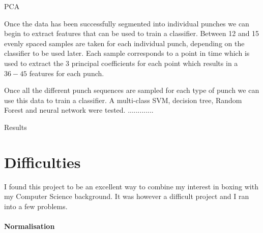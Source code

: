 PCA

Once the data has been successfully segmented into individual punches we can begin to extract features that can be used to train a classifier. Between 12 and 15 evenly spaced samples are taken for each individual punch, depending on the classifier to be used later. Each sample corresponds to a point in time which is used to extract the 3 principal coefficients for each point which results in a $36 - 45$ features for each punch.

Once all the different punch sequences are sampled for each type of punch we can use this data to train a classifier. A multi-class SVM, decision tree, Random Forest and neural network were tested. .............

Results


\section{Difficulties}
I found this project to be an excellent way to combine my interest in boxing with my Computer Science background. It was however a difficult project and I ran into a few problems.

\paragraph{Normalisation}
